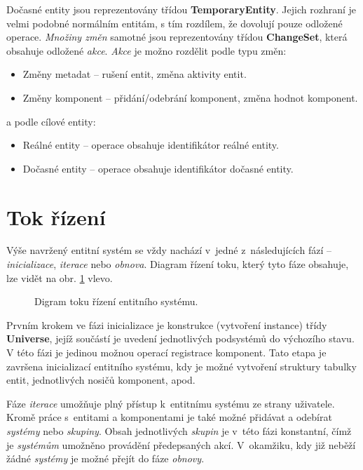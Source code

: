Dočasné entity jsou reprezentovány třídou \textbf{TemporaryEntity}. Jejich rozhraní je velmi podobné normálním entitám, s tím rozdílem, že dovolují pouze odložené operace. \emph{Množiny změn} samotné jsou reprezentovány třídou \textbf{ChangeSet}, která obsahuje odložené \emph{akce}. \emph{Akce} je možno rozdělit podle typu změn:
\begin{itemize}
	\item Změny metadat -- rušení entit, změna aktivity entit.
	\item Změny komponent -- přidání/odebrání komponent, změna hodnot komponent.
\end{itemize}
\noindent a podle cílové entity: 
\begin{itemize}
	\item Reálné entity -- operace obsahuje identifikátor reálné entity.
	\item Dočasné entity -- operace obsahuje identifikátor dočasné entity.
\end{itemize}

\section{Tok řízení}

Výše navržený entitní systém se vždy nachází v~jedné z~následujících fází -- \emph{inicializace}, \emph{iterace} nebo \emph{obnova}. Diagram řízení toku, který tyto fáze obsahuje, lze vidět na obr. \ref{Fig:DESFlow} vlevo.

\begin{figure}[H]
	\begin{center}
	\end{center}
	\caption{Digram toku řízení entitního systému.}
	\label{Fig:DESFlow}
\end{figure}

Prvním krokem ve fázi inicializace je konstrukce (vytvoření instance) třídy \textbf{Universe}, jejíž součástí je uvedení jednotlivých podsystémů do výchozího stavu. V této fázi je jedinou možnou operací registrace komponent. Tato etapa je završena inicializací entitního systému, kdy je možné vytvoření struktury tabulky entit, jednotlivých nosičů komponent, apod.

Fáze \emph{iterace} umožňuje plný přístup k~entitnímu systému ze strany uživatele. Kromě práce s~entitami a komponentami je také možné přidávat a odebírat \emph{systémy} nebo \emph{skupiny}. Obsah jednotlivých \emph{skupin} je v~této fázi konstantní, čímž je \emph{systémům} umožněno provádění předepsaných akcí. V~okamžiku, kdy již neběží žádné \emph{systémy} je možné přejít do fáze \emph{obnovy}.

